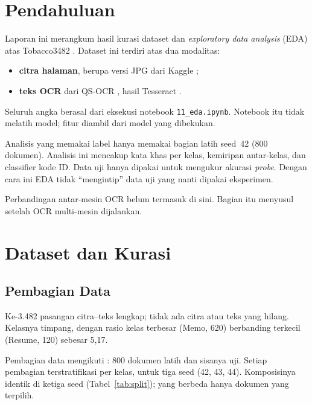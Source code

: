 \section{Pendahuluan}\label{sec:pendahuluan}

Laporan ini merangkum hasil kurasi dataset dan \textit{exploratory data analysis} (EDA)
atas Tobacco3482 \parencite{kumar2014}. Dataset ini terdiri atas dua modalitas:

\begin{itemize}
  \item \textbf{citra halaman}, berupa versi JPG dari Kaggle \parencite{kaggletobacco};
  \item \textbf{teks OCR} dari QS-OCR \parencite{qsocr}, hasil Tesseract
  \parencite{smith2007}.
\end{itemize}

Seluruh angka berasal dari eksekusi notebook \texttt{11\_eda.ipynb}. Notebook itu tidak
melatih model; fitur diambil dari model yang dibekukan.

Analisis yang memakai label hanya memakai bagian latih seed~42 (800 dokumen). Analisis
ini mencakup kata khas per kelas, kemiripan antar-kelas, dan classifier kode ID. Data uji
hanya dipakai untuk mengukur akurasi \textit{probe}. Dengan cara ini EDA tidak
\enquote{mengintip} data uji yang nanti dipakai eksperimen.

Perbandingan antar-mesin OCR belum termasuk di sini. Bagian itu menyusul setelah OCR
multi-mesin dijalankan.

\section{Dataset dan Kurasi}\label{sec:kurasi}

\subsection{Pembagian Data}

Ke-3.482 pasangan citra--teks lengkap; tidak ada citra atau teks yang hilang. Kelasnya
timpang, dengan rasio kelas terbesar (Memo, 620) berbanding terkecil (Resume, 120)
sebesar 5,17.

Pembagian data mengikuti \textcite{audebert2020}: 800 dokumen latih dan sisanya uji.
Setiap pembagian terstratifikasi per kelas, untuk tiga seed (42, 43, 44). Komposisinya
identik di ketiga seed (Tabel~\ref{tab:split}); yang berbeda hanya dokumen yang terpilih.

